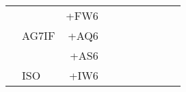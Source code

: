 \begin{center}
{\begin{tabular}{|c|lr|c|c|c|c|c|c|c|}
                        &       &      +FW6 &                            &                            &                            &                            &                            &                            &                            \\
                        & AG7IF &      +AQ6 &                            &                            &                            &                            &                            &                            &                            \\
                        &       &      +AS6 &                            &                            &                            &                            &                            &                            &                            \\
                        & ISO   &      +IW6 &                            &                            &                            &                            &                            &                            &                            \\
\hline
\end{tabular}
}
\end{center}

